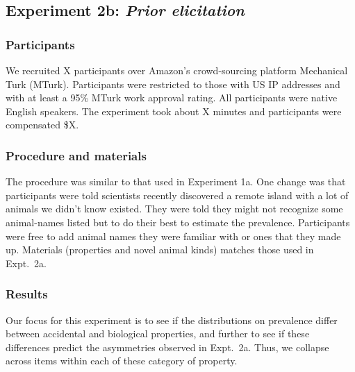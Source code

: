 \documentclass[10pt,letterpaper]{article}
\begin{document}
\subsection{Experiment 2b: \emph{Prior elicitation}}


\subsubsection{Participants}

We recruited X participants over Amazon's crowd-sourcing platform Mechanical Turk (MTurk).  Participants were restricted to those with US IP addresses and with at least a 95\% MTurk work approval rating. All participants were native English speakers. The experiment took about X minutes and participants were compensated \$X.

\subsubsection{Procedure and materials}

The procedure was similar to that used in Experiment 1a. One change was that participants were told scientists recently discovered a remote island with a lot of animals we didn't know existed. They were told they might not recognize some animal-names listed but to do their best to estimate the prevalence. Participants were free to add animal names they were familiar with or ones that they made up. Materials (properties and novel animal kinds) matches those used in Expt.~2a.

\subsubsection{Results}

Our focus for this experiment is to see if the distributions on prevalence differ between accidental and biological properties, and further to see if these differences predict the asymmetries observed in Expt.~2a. Thus, we collapse across items within each of these category of property. 
\end{document}
